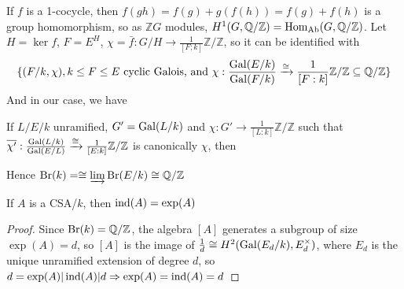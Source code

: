 \documentclass[a4paper,10pt]{article}
\begin{document}
\begin{theorem}
If $f$ is a 1-cocycle, then $f(gh)=f(g)+g(f(h))=f(g)+f(h)$ is a group homomorphism, so as $\mathbb ZG$ modules, $H^1(G,\mathbb Q/\mathbb Z)=\operatorname{Hom}_{\text{Ab}}(G,\mathbb Q/\mathbb Z)$. Let $H=\ker f$, $F=E^H$, $\chi=\bar f:G/H\to\frac{1}{[F;k]}\mathbb Z/\mathbb Z$, so it can be identified with
\[
\{(F/k,\chi),k\leq F\leq E\text{ cyclic Galois, and }\chi:\frac{\operatorname{Gal}(E/k)}{\operatorname{Gal}(F/k)}\xrightarrow{\cong}\frac{1}{[F:k]}\mathbb Z/\mathbb Z\subseteq\mathbb Q/\mathbb Z\}
\]
And in our case, we have
\begin{center}
\end{center}
If $L/E/k$ unramified, $G'=\operatorname{Gal}(L/k)$ and $\chi:G'\to\frac{1}{[L:k]}\mathbb Z/\mathbb Z$ such that $\overline{\chi'}:\frac{\operatorname{Gal}(L/k)}{\operatorname{Gal}(E/L)}\xrightarrow{\cong}\frac{1}{[E:k]}\mathbb Z/\mathbb Z$ is canonically $\chi$, then
\begin{center}
\end{center}
Hence $\operatorname{Br}(k)=\cong\varinjlim\operatorname{Br}(E/k)\cong\mathbb Q/\mathbb Z$
\end{theorem}

\begin{corollary}
If $A$ is a CSA/$k$, then $\operatorname{ind}(A)=\exp(A)$
\end{corollary}

\begin{proof}
Since $\operatorname{Br}(k)=\mathbb Q/\mathbb Z$, the algebra $[A]$ generates a subgroup of size $\exp(A)=d$, so $[A]$ is the image of $\frac{1}{d}\cong H^2(\operatorname{Gal}(E_d/k),E_d^\times)$, where $E_d$ is the unique unramified extension of degree $d$, so $d=\exp(A)|\operatorname{ind}(A)|d\Rightarrow\exp(A)=\operatorname{ind}(A)=d$
\end{proof}
\end{document}
